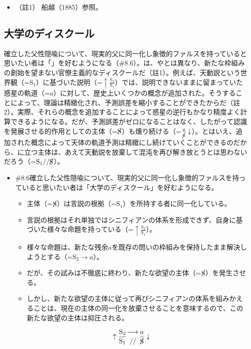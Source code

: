 \begin{itemize}
\tightlist
\item
  （註1） 船越（1885）\cite{Funakoshi}参照。
\end{itemize}

\subsection{大学のディスクール}\label{ux5927ux5b66ux306eux30c7ux30a3ux30b9ux30afux30fcux30eb}

確立した父性隠喩について、現実的父に同一化し象徴的ファルスを持っていると思いたい者は「」を好むようになる（\#8.6）。は、やとは異なり、新たな枠組みの創始を望まない官僚主義的なディスクールだ（註1）。例えば、天動説という世界観（=\(\textrm{S}_1\)）に基づいた説明（=\(\uparrow\frac{\textrm{S}_2}{\textrm{S}_1}\)）では、説明できないままに留まっていた惑星の軌道（=\(a\)）に対して、歴史上いくつかの概念が追加された。そうすることによって、理論は精緻化され、予測誤差を縮小することができたからだ（註2）。実際、それらの概念を追加することによって惑星の逆行もかなり精度よく計算できるようになる。だが、予測誤差がゼロになることはなく、したがって認識を発展させる的作用としての主体（=\(\cancel{\textrm{S}}\)）も燻り続ける（=\(\frac{a}{\cancel{\textrm{S}}}\downarrow\)）。とはいえ、追加された概念によって天体の軌道予測は精緻にし続けていくことができるのだから、に立つ主体は、あえて天動説を放棄して混沌を再び解き放とうとは思わないだろう（=\(\textrm{S}_1//\cancel{\textrm{S}}\)）。

\begin{note}{}
  \begin{itemize}
    \tightlist
    \item{\#8.6}確立した父性隠喩について、現実的父に同一化し象徴的ファルスを持っていると思いたい者は「大学のディスクール」を好むようになる。
      \begin{itemize}
        \tightlist
        \item 主体（=$\cancel{\textrm{S}}$）は言説の根拠（=$\textrm{S}_1$）を所持する者に同一化している。
        \item 言説の根拠はそれ単独ではシニフィアンの体系を形成できず、自身に基づいた様々な命題を持っている（=$\uparrow\frac{\textrm{S}_2}{\textrm{S}_1}$）。
        \item 様々な命題は、新たな残余$a$を既存の問いの枠組みを保持したまま解決しようとする（=$\textrm{S}_2\rightarrow a$）。
        \item だが、その試みは不徹底に終わり、新たな欲望の主体（=$\cancel{\textrm{S}}$）を発生させる。
        \item しかし、新たな欲望の主体に従って再びシニフィアンの体系を組みかえることは、現在の主体の同一化を放棄させることを意味するので、この新たな欲望の主体は抑圧される。
      \end{itemize}

$$
\uparrow\frac{\mathrm{S_2}}{\mathrm{S_1}}\genfrac{}{}{0pt}{}{\longrightarrow}{//}\frac{a}{\cancel{\textrm{S}}}\downarrow
$$
  \end{itemize}
\end{note}

